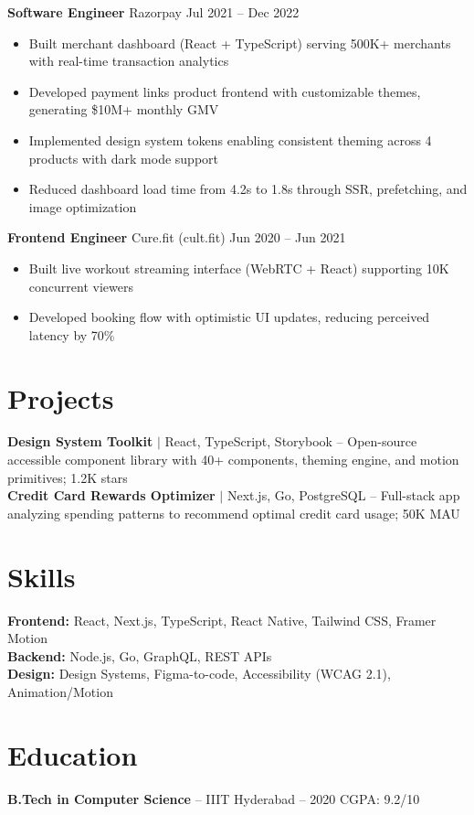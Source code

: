 \documentclass[11pt,a4paper]{article}
\begin{document}
\vspace{6pt}
\textbf{Software Engineer} \quad Razorpay \hfill {\color{accent}\small Jul 2021 -- Dec 2022}
\begin{itemize}
    \item Built merchant dashboard (React + TypeScript) serving 500K+ merchants with real-time transaction analytics
    \item Developed payment links product frontend with customizable themes, generating \$10M+ monthly GMV
    \item Implemented design system tokens enabling consistent theming across 4 products with dark mode support
    \item Reduced dashboard load time from 4.2s to 1.8s through SSR, prefetching, and image optimization
\end{itemize}

\vspace{6pt}
\textbf{Frontend Engineer} \quad Cure.fit (cult.fit) \hfill {\color{accent}\small Jun 2020 -- Jun 2021}
\begin{itemize}
    \item Built live workout streaming interface (WebRTC + React) supporting 10K concurrent viewers
    \item Developed booking flow with optimistic UI updates, reducing perceived latency by 70\%
\end{itemize}

\section{Projects}

\textbf{Design System Toolkit} {\small$\mid$ React, TypeScript, Storybook} -- Open-source accessible component library with 40+ components, theming engine, and motion primitives; 1.2K stars\\[4pt]
\textbf{Credit Card Rewards Optimizer} {\small$\mid$ Next.js, Go, PostgreSQL} -- Full-stack app analyzing spending patterns to recommend optimal credit card usage; 50K MAU

\section{Skills}

\textbf{Frontend:} React, Next.js, TypeScript, React Native, Tailwind CSS, Framer Motion\\
\textbf{Backend:} Node.js, Go, GraphQL, REST APIs\\
\textbf{Design:} Design Systems, Figma-to-code, Accessibility (WCAG 2.1), Animation/Motion

\section{Education}

\begin{center}
\textbf{B.Tech in Computer Science} -- IIIT Hyderabad  -- 2020 \quad CGPA: 9.2/10
\end{center}
\end{document}
